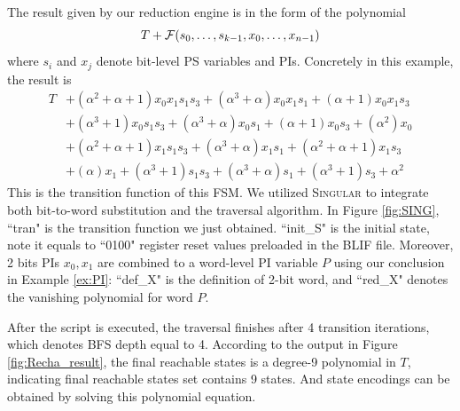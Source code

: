 \begin{Example}
The result given by our reduction engine is in the form of the polynomial
$$T+{\mathcal{F}}(s_0,\dots,s_{k-1},x_0,\dots,x_{n-1})$$ 
where $s_i$ and $x_j$ denote bit-level PS variables and PIs. Concretely in this example, the result is
\begin{align*}
T&+(\alpha^2+\alpha+1) x_0 x_1 s_1 s_3+(\alpha^3+\alpha) x_0 x_1 s_1+(\alpha+1) x_0 x_1 s_3 \\
&+(\alpha^3+1) x_0 s_1 s_3+(\alpha^3+\alpha) x_0 s_1 +(\alpha+1) x_0 s_3+(\alpha^2) x_0 \\
&+(\alpha^2+\alpha+1) x_1 s_1 s_3+(\alpha^3+\alpha) x_1 s_1+(\alpha^2+\alpha+1) x_1 s_3\\
&+(\alpha) x_1+(\alpha^3+1) s_1 s_3+(\alpha^3+\alpha) s_1+(\alpha^3+1) s_3+\alpha^2
\end{align*}
This is the transition function of this FSM. We utilized \textsc{Singular} to integrate both 
bit-to-word substitution and the traversal algorithm. In Figure \ref{fig:SING}, ``tran" is the transition
function we just obtained. ``init\_S" is the initial state, note it equals to ``0100" register 
reset values preloaded in the BLIF file. Moreover, 2 bits PIs $x_0,x_1$ are combined to a word-level 
PI variable $P$ using our conclusion in Example \ref{ex:PI}: ``def\_X" is the definition of 2-bit 
word, and ``red\_X" denotes the vanishing polynomial for word $P$.


After the script is executed, the traversal finishes after 4 
transition iterations, which denotes BFS depth equal to 4. According to the output in
Figure \ref{fig:Recha_result}, the final reachable states 
is a degree-9 polynomial in $T$, indicating final reachable states set contains 9 states.
And state encodings can be obtained by solving this polynomial equation.


\end{Example}
